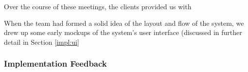 Over the course of these meetings, the clients provided us with  

When the team had formed a solid idea of the layout and flow of the
system, we drew up some early mockups of the system's user interface
(discussed in further detail in Section \ref{impl:ui}

\subsubsection{Implementation Feedback}
